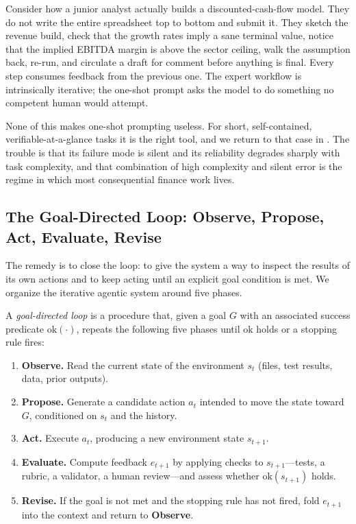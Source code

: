 \begin{context}
Consider how a junior analyst actually builds a discounted-cash-flow model. They do not write the entire spreadsheet top to bottom and submit it. They sketch the revenue build, check that the growth rates imply a sane terminal value, notice that the implied EBITDA margin is above the sector ceiling, walk the assumption back, re-run, and circulate a draft for comment before anything is final. Every step consumes feedback from the previous one. The expert workflow is intrinsically iterative; the one-shot prompt asks the model to do something no competent human would attempt.
\end{context}

None of this makes one-shot prompting useless. For short, self-contained, verifiable-at-a-glance tasks it is the right tool, and we return to that case in . The trouble is that its failure mode is silent and its reliability degrades sharply with task complexity, and that combination of high complexity and silent error is the regime in which most consequential finance work lives.

\subsection{The Goal-Directed Loop: Observe, Propose, Act, Evaluate, Revise}\label{subsec:goal-directed-loop}

The remedy is to close the loop: to give the system a way to inspect the results of its own actions and to keep acting until an explicit goal condition is met. We organize the iterative agentic system around five phases.

\begin{definition}\label{def:goal-directed-loop}
A \emph{goal-directed loop} is a procedure that, given a goal $G$ with an associated success predicate $\mathrm{ok}(\cdot)$, repeats the following five phases until $\mathrm{ok}$ holds or a stopping rule fires:
\begin{enumerate}
  \item \textbf{Observe.} Read the current state of the environment $s_t$ (files, test results, data, prior outputs).
  \item \textbf{Propose.} Generate a candidate action $a_t$ intended to move the state toward $G$, conditioned on $s_t$ and the history.
  \item \textbf{Act.} Execute $a_t$, producing a new environment state $s_{t+1}$.
  \item \textbf{Evaluate.} Compute feedback $e_{t+1}$ by applying checks to $s_{t+1}$---tests, a rubric, a validator, a human review---and assess whether $\mathrm{ok}(s_{t+1})$ holds.
  \item \textbf{Revise.} If the goal is not met and the stopping rule has not fired, fold $e_{t+1}$ into the context and return to \textbf{Observe}.
\end{enumerate}
\end{definition}

